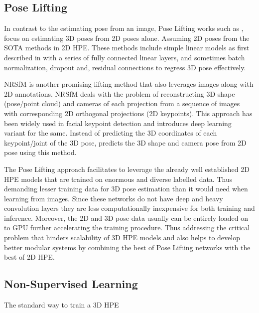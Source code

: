 \subsection{Pose Lifting}

In contrast to the estimating pose from an image, Pose Lifting works such as \cite{poselifter,  amazon1, repnet, c3dpo, unsupervisedAdversarial}, focus on estimating 3D poses from 2D poses alone. Assuming 2D poses from the \ac{SOTA} methods in 2D \ac{HPE}. These methods include simple linear models as first described in \cite{MartinezHRL17} with a series of fully connected linear layers, and sometimes batch normalization, dropout and, residual connections to regress 3D pose effectively. 

 \ac{NRSfM} is another promising lifting method that also leverages images along with 2D annotations. \ac{NRSfM} deals with the problem of reconstructing 3D shape (pose/point cloud) and cameras of each projection from a sequence of images with corresponding 2D orthogonal projections (2D keypoints). This approach has been widely used in facial keypoint detection and \cite{deepNRSFM} introduces deep learning variant for the same. Instead of predicting the 3D coordinates of each keypoint/joint of the 3D pose, \cite{DistillNRSfM, c3dpo, deepNRSFM, nrsfm++} predicts the 3D shape and camera pose from 2D pose using this method. 

The Pose Lifting approach facilitates to leverage the already well established 2D \ac{HPE} models that are trained on enormous and diverse labelled data. Thus demanding lesser training data for 3D pose estimation than it would need when learning from images. Since these networks do not have deep and heavy convolution layers they are less computationally inexpensive for both training and inference. Moreover, the 2D and 3D pose data usually can be entirely loaded on to GPU further accelerating the training procedure. Thus addressing the critical problem that hinders scalability of 3D \ac{HPE} models and also helps to develop better modular systems by combining the best of Pose Lifting networks with the best of 2D \ac{HPE}.

\subsection{Non-Supervised Learning}
The standard way to train a 3D \ac{HPE}

